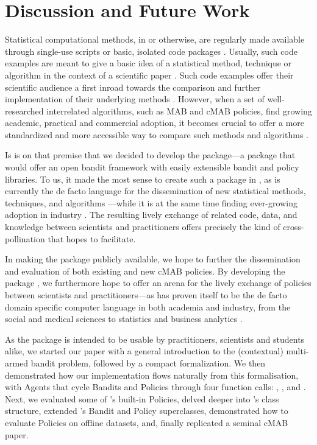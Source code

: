 \documentclass{jss}\usepackage[]{graphicx}\usepackage[]{color}
\begin{document}
\section{Discussion and Future Work}

Statistical computational methods, in  or otherwise, are regularly made available through single-use scripts or basic, isolated code packages \citep{Gandrud2016}. Usually, such code examples are meant to give a basic idea of a statistical method, technique or algorithm in the context of a scientific paper \citep{Stodden2013}. Such code examples offer their scientific audience a first inroad towards the comparison and further implementation of their underlying methods \citep{Buckheit1995}. However, when a set of well-researched interrelated algorithms, such as MAB and cMAB policies, find growing academic, practical and commercial adoption, it becomes crucial to offer a more standardized and more accessible way to compare such methods and algorithms \citep{Mesirov2010}.

Is is on that premise that we decided to develop the   package---a package that would offer an open bandit framework with easily extensible bandit and policy libraries. To us, it made the most sense to create such a package in  \citep{RCore}, as  is currently the de facto language for the dissemination of new statistical methods, techniques, and algorithms \citep{Tippmann2015}---while it is at the same time finding ever-growing adoption in industry \citep{2012}. The resulting lively exchange of  related code, data, and knowledge between scientists and practitioners offers precisely the kind of cross-pollination that  hopes to facilitate.

In making the package publicly available, we hope to further the dissemination and evaluation of both existing and new cMAB policies. By developing the package , we furthermore hope to offer an arena for the lively exchange of policies between scientists and practitioners---as  has proven itself to be the de facto domain specific computer language in both academia and industry, from the social and medical sciences to statistics and business analytics \citep{Tippmann2015}.

As the package is intended to be usable by practitioners, scientists and students alike, we started our paper with a general introduction to the (contextual) multi-armed bandit problem, followed by a compact formalization. We then demonstrated how our implementation flows naturally from this formalisation, with Agents that cycle Bandits and Policies through four function calls: , ,  and . Next, we evaluated some of 's built-in Policies, delved deeper into 's class structure, extended 's Bandit and Policy superclasses, demonstrated how to evaluate Policies on offline datasets, and, finally replicated a seminal cMAB paper.
\end{document}
